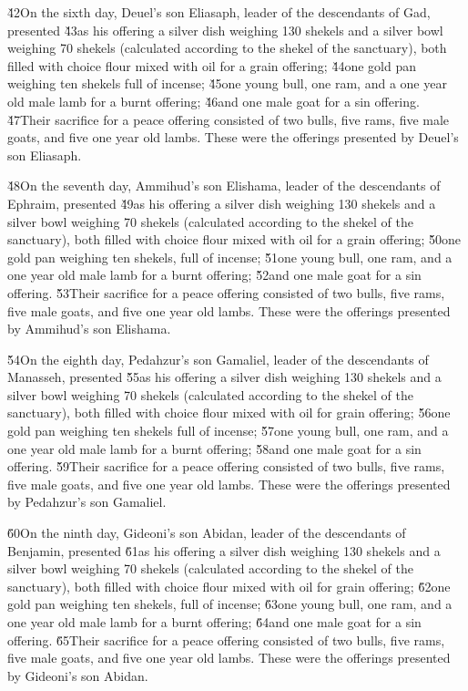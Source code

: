 \v{42}On the sixth day, Deuel's son Eliasaph, leader of the descendants of Gad, presented \v{43}as his offering a silver dish weighing 130 shekels and a silver bowl weighing 70 shekels (calculated according to the shekel of the sanctuary), both filled with choice flour mixed with oil for a grain offering; \v{44}one gold pan weighing ten shekels full of incense; \v{45}one young bull, one ram, and a one year old male lamb for a burnt offering; \v{46}and one male goat for a sin offering. \v{47}Their sacrifice for a peace offering consisted of two bulls, five rams, five male goats, and five one year old lambs. These were the offerings presented by Deuel's son Eliasaph.

\v{48}On the seventh day, Ammihud's son Elishama, leader of the descendants of Ephraim, presented \v{49}as his offering a silver dish weighing 130 shekels and a silver bowl weighing 70 shekels (calculated according to the shekel of the sanctuary), both filled with choice flour mixed with oil for a grain offering; \v{50}one gold pan weighing ten shekels, full of incense; \v{51}one young bull, one ram, and a one year old male lamb for a burnt offering; \v{52}and one male goat for a sin offering. \v{53}Their sacrifice for a peace offering consisted of two bulls, five rams, five male goats, and five one year old lambs. These were the offerings presented by Ammihud's son Elishama.

\v{54}On the eighth day, Pedahzur's son Gamaliel, leader of the descendants of Manasseh, presented \v{55}as his offering a silver dish weighing 130 shekels and a silver bowl weighing 70 shekels (calculated according to the shekel of the sanctuary), both filled with choice flour mixed with oil for grain offering; \v{56}one gold pan weighing ten shekels full of incense; \v{57}one young bull, one ram, and a one year old male lamb for a burnt offering; \v{58}and one male goat for a sin offering. \v{59}Their sacrifice for a peace offering consisted of two bulls, five rams, five male goats, and five one year old lambs. These were the offerings presented by Pedahzur's son Gamaliel.

\v{60}On the ninth day, Gideoni's son Abidan, leader of the descendants of Benjamin, presented \v{61}as his offering a silver dish weighing 130 shekels and a silver bowl weighing 70 shekels (calculated according to the shekel of the sanctuary), both filled with choice flour mixed with oil for grain offering; \v{62}one gold pan weighing ten shekels, full of incense; \v{63}one young bull, one ram, and a one year old male lamb for a burnt offering; \v{64}and one male goat for a sin offering. \v{65}Their sacrifice for a peace offering consisted of two bulls, five rams, five male goats, and five one year old lambs. These were the offerings presented by Gideoni's son Abidan.

